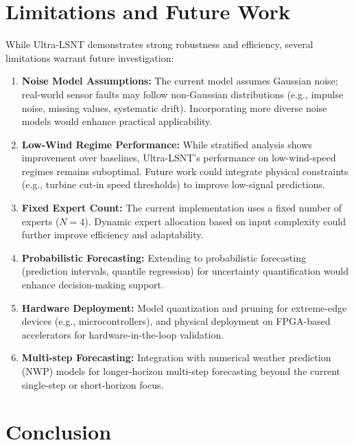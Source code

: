 \documentclass[review,3p,times,draft]{elsarticle}
\begin{document}
\section{Limitations and Future Work}
\label{sec:limitations}

While Ultra-LSNT demonstrates strong robustness and efficiency, several limitations warrant future investigation:

\begin{enumerate}[label=(\arabic*)]
    \item \textbf{Noise Model Assumptions:} The current model assumes Gaussian noise; real-world sensor faults may follow non-Gaussian distributions (e.g., impulse noise, missing values, systematic drift). Incorporating more diverse noise models would enhance practical applicability.
    
    \item \textbf{Low-Wind Regime Performance:} While stratified analysis shows improvement over baselines, Ultra-LSNT's performance on low-wind-speed regimes remains suboptimal. Future work could integrate physical constraints (e.g., turbine cut-in speed thresholds) to improve low-signal predictions.
    
    \item \textbf{Fixed Expert Count:} The current implementation uses a fixed number of experts ($N=4$). Dynamic expert allocation based on input complexity could further improve efficiency and adaptability.
    
    \item \textbf{Probabilistic Forecasting:} Extending to probabilistic forecasting (prediction intervals, quantile regression) for uncertainty quantification would enhance decision-making support.
    
    \item \textbf{Hardware Deployment:} Model quantization and pruning for extreme-edge devices (e.g., microcontrollers), and physical deployment on FPGA-based accelerators for hardware-in-the-loop validation.
    
    \item \textbf{Multi-step Forecasting:} Integration with numerical weather prediction (NWP) models for longer-horizon multi-step forecasting beyond the current single-step or short-horizon focus.
\end{enumerate}

\section{Conclusion}
\label{sec:conclusion}
\end{document}
